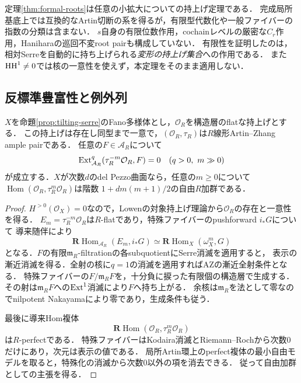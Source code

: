 \begin{remark}\label{rem:formal-boundaries}
定理\ref{thm:formal-roots}は任意の小拡大についての持上げ定理である．
完成局所基底上では互換的なArtin切断の系を得るが，有限型代数化や一般ファイバーの指数の分類は含まない．
$s$自身の有限位数作用，cochainレベルの厳密な$C_r$作用，Haniharaの巡回不変root pairも構成していない．
有限性を証明したのは，相対Serreを自動的に持ち上げられる\emph{変形の持上げ集合}への作用である．
また$\operatorname{HH}^1\ne0$では核の一意性を使えず，本定理をそのまま適用しない．
\end{remark}

\subsection{反標準豊富性と例外列}
\begin{proposition}\label{prop:relative-ample}
$X$を命題\ref{prop:tilting-serre}のFano多様体とし，$\mathcal O_R$を構造層のflatな持上げとする．
この持上げは存在し同型まで一意で，$(\mathcal O_R,\tau_R)$は$R$線形Artin--Zhang ample pairである．
任意の$F\in\mathcal A_R$について
\[
 \operatorname{Ext}^{q}_{\mathcal A_R}(\tau_R^{-m}\mathcal O_R,F)=0
 \quad(q>0,\ m\gg0)
\]
が成立する．$X$が次数$d$のdel Pezzo曲面なら，任意の$m\ge0$について
$\operatorname{Hom}(\mathcal O_R,\tau_R^m\mathcal O_R)$は階数
$1+d m(m+1)/2$の自由$R$加群である．
\end{proposition}
\begin{proof}
$H^{>0}(\mathcal O_X)=0$なので，Lowenの対象持上げ理論から$\mathcal O_R$の存在と一意性を得る．
$E_m=\tau_R^{-m}\mathcal O_R$は$R$-flatであり，特殊ファイバーのpushforward $i_*G$について
導来随伴により
\[
 \mathbf R\operatorname{Hom}_{\mathcal A_R}(E_m,i_*G)
 \simeq\mathbf R\operatorname{Hom}_X(\omega_X^m,G)
\]
となる．$F$の有限$\mathfrak m_R$-filtrationの各subquotientにSerre消滅を適用すると，
表示の漸近消滅を得る．全射の核に$q=1$の消滅を適用すればAZの漸近全射条件となる．
特殊ファイバーの$F/\mathfrak m_RF$を，十分負に捩った有限個の構造層で生成する．
その射は$\mathfrak m_RF$への$\operatorname{Ext}^1$消滅により$F$へ持ち上がる．
余核は$\mathfrak m_R$を法として零なのでnilpotent Nakayamaにより零であり，生成条件も従う．

最後に導来Hom複体
\[
 \mathbf R\operatorname{Hom}(\mathcal O_R,\tau_R^m\mathcal O_R)
\]
は$R$-perfectである．
特殊ファイバーはKodaira消滅とRiemann--Rochから次数0だけにあり，次元は表示の値である．
局所Artin環上のperfect複体の最小自由モデルを取ると，特殊化の消滅から次数0以外の項を消去できる．
従って自由加群としての主張を得る．
\end{proof}

